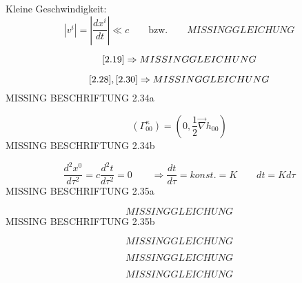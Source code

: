 \documentclass[a4paper, 11pt]{article}
\numberwithin{equation}{section}
\begin{document}
Kleine Geschwindigkeit: 
\begin{equation}
\left| v^i \right| = \left| \dfrac{dx^i}{dt} \right| \ll c \qquad \text{bzw.} \qquad MISSING GLEICHUNG
\end{equation}


\begin{equation}
\text{\ref{2.19}} \Rightarrow MISSING GLEICHUNG
\end{equation}

\begin{equation}
\ref{2.28}, \ref{2.30} \Rightarrow MISSING GLEICHUNG
\end{equation}
MISSING BESCHRIFTUNG 2.34a

\begin{equation*}
\left( \Gamma^\kappa_{00} \right) = \left( 0, \frac{1}{2} \vec{\nabla} h_{00} \right)
\end{equation*}
MISSING BESCHRIFTUNG 2.34b

\begin{equation}
\dfrac{d^2x^0}{d\tau^2} = c \dfrac{d^2t}{d\tau^2} = 0 \qquad \Rightarrow \dfrac{dt}{d\tau} = konst. = K \qquad dt = K d\tau
\end{equation}
MISSING BESCHRIFTUNG 2.35a

\begin{equation*}
MISSING GLEICHUNG
\end{equation*}
MISSING BESCHRIFTUNG 2.35b

\begin{equation}
MISSING GLEICHUNG
\end{equation}

\begin{equation}
MISSING GLEICHUNG
\end{equation}

\begin{equation}
\boxed{
MISSING GLEICHUNG}
\end{equation}
\end{document}

